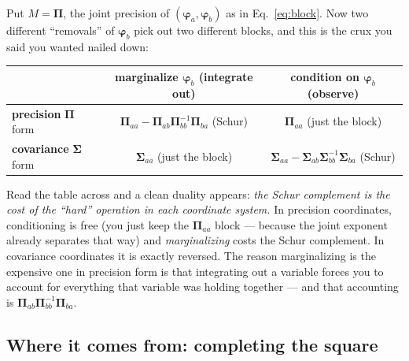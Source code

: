 \documentclass[11pt]{article}
\newcommand{\Prec}{\bm{\Pi}}        %
\newcommand{\Cov}{\bm{\Sigma}}
\newcommand{\fvec}{\bm{\varphi}}    %
\theoremstyle{definition}
\begin{document}
Put $M=\Prec$, the joint precision of $(\fvec_a,\fvec_b)$ as in
Eq.~\eqref{eq:block}. Now two different ``removals'' of $\fvec_b$ pick out
two different blocks, and this is the crux you said you wanted nailed down:

\begin{center}
\renewcommand{\arraystretch}{1.5}
\begin{tabular}{l|c|c}
 & \textbf{marginalize} $\fvec_b$ (integrate out) & \textbf{condition} on $\fvec_b$ (observe) \\\hline
\textbf{precision} $\Prec$ form & $\Prec_{aa}-\Prec_{ab}\Prec_{bb}^{-1}\Prec_{ba}$ \;(Schur) & $\Prec_{aa}$ \;(just the block) \\\hline
\textbf{covariance} $\Cov$ form & $\Cov_{aa}$ \;(just the block) & $\Cov_{aa}-\Cov_{ab}\Cov_{bb}^{-1}\Cov_{ba}$ \;(Schur)
\end{tabular}
\end{center}

Read the table across and a clean duality appears: \emph{the Schur
complement is the cost of the ``hard'' operation in each coordinate
system.} In precision coordinates, conditioning is free (you just keep the
$\Prec_{aa}$ block --- because the joint exponent already separates that
way) and \emph{marginalizing} costs the Schur complement. In covariance
coordinates it is exactly reversed. The reason marginalizing is the
expensive one in precision form is that integrating out a variable forces
you to account for everything that variable was holding together --- and
that accounting is $\Prec_{ab}\Prec_{bb}^{-1}\Prec_{ba}$.

\subsection{Where it comes from: completing the square}
\end{document}
